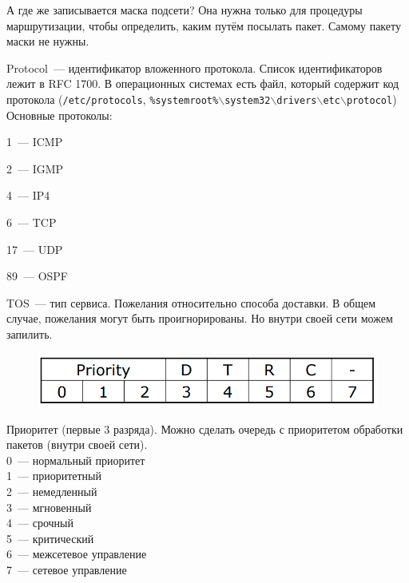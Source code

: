А где же записывается маска подсети? Она нужна только для процедуры маршрутизации, чтобы определить, каким путём посылать пакет. Самому пакету маски не нужны. 

\begin{MyItemize}
    \item Protocol~--- идентификатор вложенного протокола. Список идентификаторов лежит в RFC 1700. В операционных системах есть файл, который содержит код протокола ({\tt /etc/protocols}, {\tt \%systemroot\%$\backslash$system32$\backslash$drivers$\backslash$etc$\backslash$protocol})\\
    Основные протоколы:
    \begin{MyItemize}
        \item 1~--- ICMP
        \item 2~--- IGMP
        \item 4~--- IP4
        \item 6~--- TCP
        \item 17~--- UDP
        \item 89~--- OSPF
    \end{MyItemize}
    \item TOS~--- тип сервиса. Пожелания относительно способа доставки. В общем случае, пожелания могут быть проигнорированы. Но внутри своей сети можем запилить.\\
    \begin{figure}[H]
        \centering
        \includegraphics[width=15cm]{images/02/02}
    \end{figure}
    \begin{MyItemize}
        \item Приоритет (первые 3 разряда). Можно сделать очередь с приоритетом обработки пакетов (внутри своей сети).\\
        0~--- нормальный приоритет\\
        1~--- приоритетный\\
        2~--- немедленный\\
        3~--- мгновенный\\
        4~--- срочный\\
        5~--- критический\\
        6~--- межсетевое управление\\ 
        7~--- сетевое управление\\


\end{MyItemize}
\end{MyItemize}
